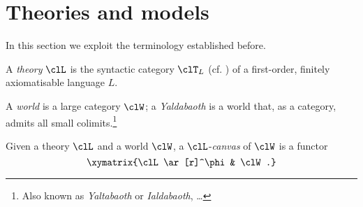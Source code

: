 \documentclass[a4paper]{../birkjour}
\begin{document}


\section{Theories and models}
\label{sec:orge02f333}
In this section we exploit the terminology established before.
\begin{definition}[Theory]
  A \emph{theory} $\clL$ is the syntactic category $\clT_L$ (cf. \cite{lambek1988introduction}) of a first-order, finitely axiomatisable language $L$.
\end{definition}
\begin{definition}
  A \emph{world} is a large category $\clW$; a \emph{Yaldabaoth} is a world that, as a category, admits all small colimits.\footnote{Also known as \emph{Yaltabaoth} or \emph{Ialdabaoth}, \dots}
\end{definition}
Given a theory $\clL$ and a world $\clW$, a $\clL$-\emph{canvas} of $\clW$ is a functor 
\[\xymatrix{\clL \ar[r]^\phi & \clW.}\]
\end{document}
